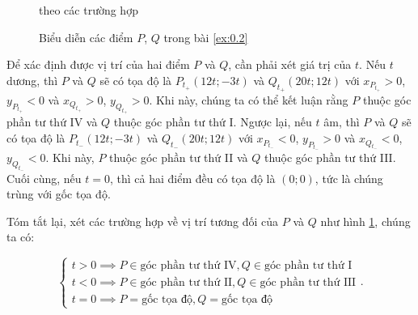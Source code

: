 \begin{figure}[h]
   \centering
   \caption{Biểu diễn các điểm $P$, $Q$ trong bài \ref{ex:0.2}} theo các trường hợp
   \label{fig:toa do vuong goc PQ}
\end{figure}

Để xác định được vị trí của hai điểm $P$ và $Q$, cần phải xét giá trị của $t$. Nếu $t$ dương, thì $P$ và $Q$ sẽ có tọa độ là $P_{t_+}(12t;-3t)$ và $Q_{t_+}(20t;12t)$ với $x_{P_{t_+}}>0$, $y_{P_{t_+}}<0$ và $x_{Q_{t_+}}>0$, $y_{Q_{t_+}}>0$. Khi này, chúng ta có thể kết luận rằng $P$ thuộc góc phần tư thứ IV và $Q$ thuộc góc phần tư thứ I. Ngược lại, nếu $t$ âm, thì $P$ và $Q$ sẽ có tọa độ là $P_{t_-}(12t;-3t)$ và $Q_{t_-}(20t;12t)$ với $x_{P_{t_-}}<0$, $y_{P_{t_-}}>0$ và $x_{Q_{t_-}}<0$, $y_{Q_{t_-}}<0$. Khi này, $P$ thuộc góc phần tư thứ II và $Q$ thuộc góc phần tư thứ III. Cuối cùng, nếu $t=0$, thì cả hai điểm đều có tọa độ là $(0;0)$, tức là chúng trùng với gốc tọa độ.

Tóm tắt lại, xét các trường hợp về vị trí tương đối của $P$ và $Q$ như hình \ref{fig:toa do vuong goc PQ}, chúng ta có:

$$
\boxed{ 
   \begin{cases}
      t>0 \implies P \in \text{góc phần tư thứ IV}, Q \in \text{góc phần tư thứ I} \\
      t<0 \implies P \in \text{góc phần tư thứ II}, Q \in \text{góc phần tư thứ III} \\
      t=0 \implies P = \text{gốc tọa độ}, Q = \text{gốc tọa độ}
   \end{cases}
}.
$$

